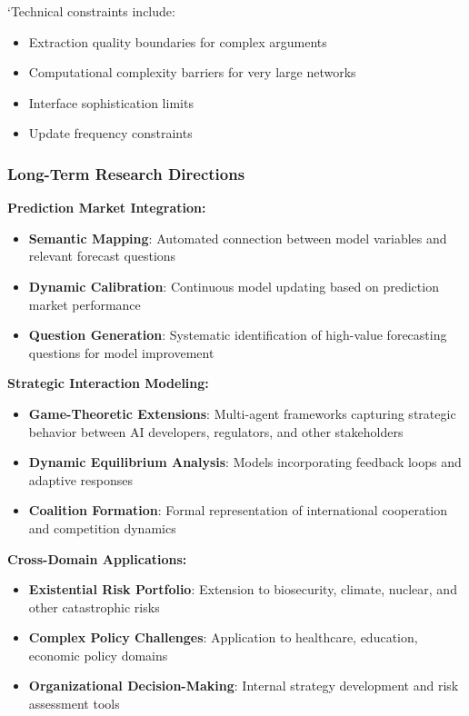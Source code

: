 \documentclass[
  11pt,
  letterpaper,
]{book}
\providecommand{\tightlist}{%
  \setlength{\itemsep}{0pt}\setlength{\parskip}{0pt}}
\begin{document}
`Technical constraints include:

\begin{itemize}
\tightlist
\item
  Extraction quality boundaries for complex arguments
\item
  Computational complexity barriers for very large networks
\item
  Interface sophistication limits
\item
  Update frequency constraints
\end{itemize}

\subsubsection{Long-Term Research
Directions}\label{sec-long-term-research2}

\textbf{Prediction Market Integration:}

\begin{itemize}
\tightlist
\item
  \textbf{Semantic Mapping}: Automated connection between model
  variables and relevant forecast questions
\item
  \textbf{Dynamic Calibration}: Continuous model updating based on
  prediction market performance
\item
  \textbf{Question Generation}: Systematic identification of high-value
  forecasting questions for model improvement
\end{itemize}

\textbf{Strategic Interaction Modeling:}

\begin{itemize}
\tightlist
\item
  \textbf{Game-Theoretic Extensions}: Multi-agent frameworks capturing
  strategic behavior between AI developers, regulators, and other
  stakeholders
\item
  \textbf{Dynamic Equilibrium Analysis}: Models incorporating feedback
  loops and adaptive responses
\item
  \textbf{Coalition Formation}: Formal representation of international
  cooperation and competition dynamics
\end{itemize}

\textbf{Cross-Domain Applications:}

\begin{itemize}
\tightlist
\item
  \textbf{Existential Risk Portfolio}: Extension to biosecurity,
  climate, nuclear, and other catastrophic risks
\item
  \textbf{Complex Policy Challenges}: Application to healthcare,
  education, economic policy domains
\item
  \textbf{Organizational Decision-Making}: Internal strategy development
  and risk assessment tools
\end{itemize}
\end{document}
